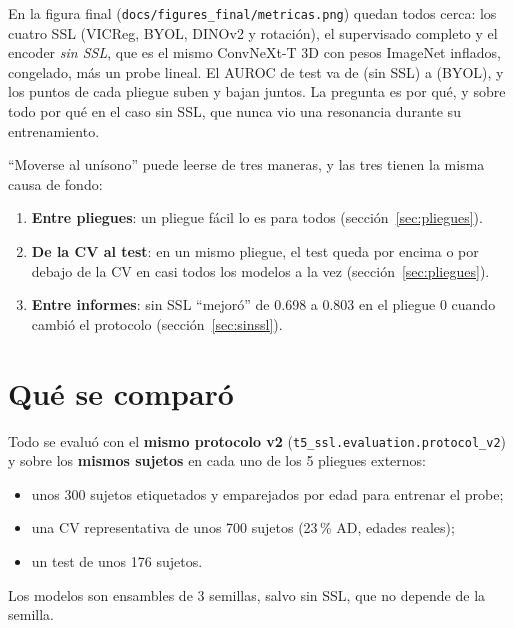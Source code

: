 \documentclass[11pt,a4paper]{article}
\begin{document}
En la figura final (\texttt{docs/figures\_final/metricas.png}) quedan todos cerca: los
cuatro SSL (VICReg, BYOL, DINOv2 y rotación), el supervisado completo y el encoder
\emph{sin SSL}, que es el mismo ConvNeXt-T 3D con pesos ImageNet inflados, congelado,
más un probe lineal. El AUROC de test va de \ninitTest{} (sin SSL) a \nbyolTest{} (BYOL),
y los puntos de cada pliegue suben y bajan juntos. La pregunta es por qué, y sobre todo
por qué en el caso sin SSL, que nunca vio una resonancia durante su entrenamiento.

``Moverse al unísono'' puede leerse de tres maneras, y las tres tienen la misma causa de
fondo:
\begin{enumerate}
  \item \textbf{Entre pliegues}: un pliegue fácil lo es para todos (sección~\ref{sec:pliegues}).
  \item \textbf{De la CV al test}: en un mismo pliegue, el test queda por encima o por
        debajo de la CV en casi todos los modelos a la vez (sección~\ref{sec:pliegues}).
  \item \textbf{Entre informes}: sin SSL ``mejoró'' de 0.698 a 0.803 en el pliegue 0
        cuando cambió el protocolo (sección~\ref{sec:sinssl}).
\end{enumerate}

\section{Qué se comparó}

Todo se evaluó con el \textbf{mismo protocolo v2} (\texttt{t5\_ssl.evaluation.protocol\_v2})
y sobre los \textbf{mismos sujetos} en cada uno de los 5 pliegues externos:
\begin{itemize}
  \item unos 300 sujetos etiquetados y emparejados por edad para entrenar el probe;
  \item una CV representativa de unos 700 sujetos (23\,\% AD, edades reales);
  \item un test de unos 176 sujetos.
\end{itemize}
Los modelos son ensambles de 3 semillas, salvo sin SSL, que no depende de la semilla.
\end{document}
